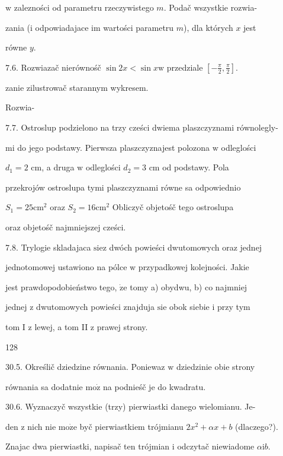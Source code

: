 \documentclass[a4paper,12pt]{article}
\begin{document}
$\mathrm{w}$ zalezności od parametru rzeczywistego $m$. Podač wszystkie rozwia-

zania ($\mathrm{i}$ odpowiadajace im wartości parametru $m$), dla których $x$ jest

równe $y.$

7.6. Rozwiazač nierównośč $\sin 2x<\sin x\mathrm{w}$ przedziale $[-\displaystyle \frac{\pi}{2},\frac{\pi}{2}]$.

zanie zilustrowač starannym wykresem.

Rozwia-

7.7. Ostroslup podzielono na trzy cześci dwiema plaszczyznami równolegly-

mi do jego podstawy. Pierwsza plaszczyznajest polozona $\mathrm{w}$ odleglości

$d_{1} = 2$ cm, a druga $\mathrm{w}$ odleglości $d_{2} = 3$ cm od podstawy. Pola

przekrojów ostroslupa tymi plaszczyznami równe sa odpowiednio

$S_{1} = 25 \mathrm{c}\mathrm{m}^{2}$ oraz $S_{2} = 16 \mathrm{c}\mathrm{m}^{2}$ Obliczyč objetośč tego ostroslupa

oraz objetośč najmniejszej cześci.

7.8. Trylogie skladajaca $\mathrm{s}\mathrm{i}\mathrm{e} \mathrm{z}$ dwóch powieści dwutomowych oraz jednej

jednotomowej ustawiono na pólce $\mathrm{w}$ przypadkowej kolejności. Jakie

jest prawdopodobieństwo tego, $\dot{\mathrm{z}}\mathrm{e}$ tomy a) obydwu, b) co najmniej

jednej $\mathrm{z}$ dwutomowych powieści znajduja $\mathrm{s}\mathrm{i}\mathrm{e}$ obok siebie $\mathrm{i}$ przy tym

tom I $\mathrm{z}$ lewej, a tom II $\mathrm{z}$ prawej strony.





128

30.5. Określič dziedzine równania. Poniewaz $\mathrm{w}$ dziedzinie obie strony

równania sa dodatnie $\mathrm{m}\mathrm{o}\dot{\mathrm{z}}$ na podnieśč je do kwadratu.

30.6. Wyznaczyč wszystkie (trzy) pierwiastki danego wielomianu. Je-

den $\mathrm{z}$ nich nie $\mathrm{m}\mathrm{o}\dot{\mathrm{z}}\mathrm{e}$ byč pierwiastkiem trójmianu $2x^{2}+\alpha x+b$ (dlaczego?).

Znajac dwa pierwiastki, napisač ten trójmian $\mathrm{i}$ odczytač niewiadome $\alpha \mathrm{i}b.$
\end{document}
